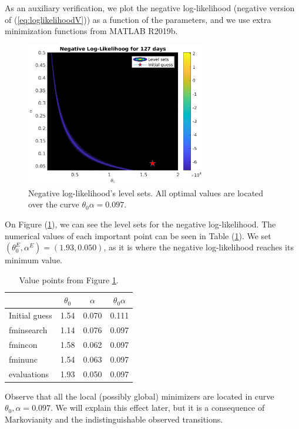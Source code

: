 \documentclass[11pt]{article}
\theoremstyle{definition}
\begin{document}
As an auxiliary verification, we plot the negative log-likelihood (negative version of (\ref{eq:loglikelihoodV})) as a function of the parameters, and we use extra minimization functions from MATLAB R2019b.

\begin{figure}[H]
\centering
\includegraphics[width=0.7\textwidth]{../../MATLAB_Files/Results/likelihood/normal/Log-Likelihood.eps}
\caption{Negative log-likelihood's level sets. All optimal values are located over the curve $\theta_0\alpha=0.097$.}
\label{fig:neg-LL}
\end{figure}
On Figure (\ref{fig:neg-LL}), we can see the level sets for the negative log-likelihood. The numerical values of each important point can be seen in Table (\ref{tab:optimal_values}). We set $(\theta_0^E,\alpha^E)=(1.93,0.050)$, as it is where the negative log-likelihood reaches its minimum value.
\begin{table}[H]
\centering
\begin{tabular}{lccc}
\toprule
 & $\theta_0$ & $\alpha$ & $\theta_0\alpha$\\
 \midrule
 Initial guess & 1.54 & 0.070 & 0.111 \\
 fminsearch & 1.14 & 0.076 & 0.097 \\
 fmincon & 1.58 & 0.062 & 0.097 \\
 fminunc & 1.54 & 0.063 & 0.097 \\
 evaluations & 1.93 & 0.050 & 0.097 \\
 \bottomrule
\end{tabular}
\caption{Value points from Figure \ref{fig:neg-LL}.}
\label{tab:optimal_values}
\end{table}
Observe that all the local (possibly global) minimizers are located in curve $\theta_0,\alpha=0.097$. We will explain this effect later, but it is a consequence of Markovianity and the indistinguishable observed transitions.
\end{document}
